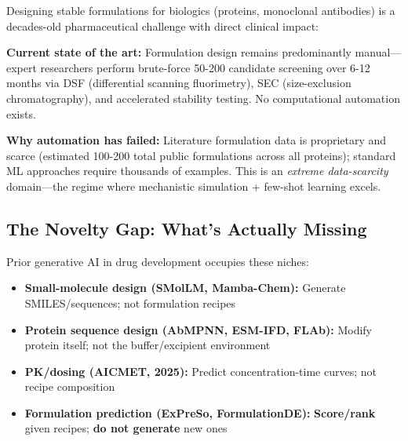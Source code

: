 \documentclass[11pt]{article}
\begin{document}
Designing stable formulations for biologics (proteins, monoclonal antibodies) is a decades-old pharmaceutical challenge with direct clinical impact:


\textbf{Current state of the art:} Formulation design remains predominantly manual—expert researchers perform brute-force 50-200 candidate screening over 6-12 months via DSF (differential scanning fluorimetry), SEC (size-exclusion chromatography), and accelerated stability testing. No computational automation exists.

\textbf{Why automation has failed:} Literature formulation data is proprietary and scarce (estimated 100-200 total public formulations across all proteins); standard ML approaches require thousands of examples. This is an \textit{extreme data-scarcity} domain—the regime where mechanistic simulation + few-shot learning excels.

\subsection{The Novelty Gap: What's Actually Missing}

Prior generative AI in drug development occupies these niches:
\begin{itemize}
    \item \textbf{Small-molecule design (SMolLM, Mamba-Chem):} Generate SMILES/sequences; not formulation recipes
    \item \textbf{Protein sequence design (AbMPNN, ESM-IFD, FLAb):} Modify protein itself; not the buffer/excipient environment
    \item \textbf{PK/dosing (AICMET, 2025):} Predict concentration-time curves; not recipe composition
    \item \textbf{Formulation prediction (ExPreSo, FormulationDE):} \textbf{Score/rank} given recipes; \textbf{do not generate} new ones
\end{itemize}
\end{document}
